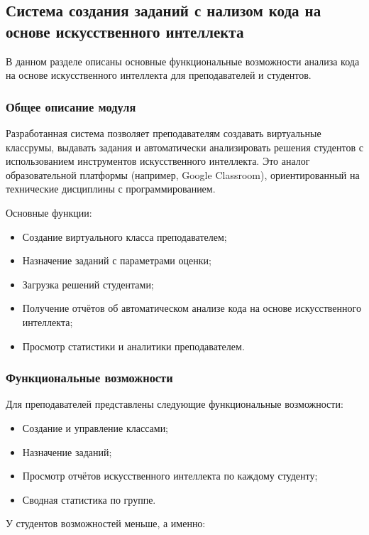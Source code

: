 \subsection{Система создания заданий с нализом кода на основе искусственного интеллекта}

В данном разделе описаны основные функциональные возможности анализа кода на основе искусственного интеллекта для преподавателей и студентов.

\subsubsection{Общее описание модуля}
Разработанная система позволяет преподавателям создавать виртуальные классрумы, выдавать задания и автоматически анализировать решения студентов с использованием инструментов искусственного интеллекта. Это аналог образовательной платформы (например, Google Classroom), ориентированный на технические дисциплины с программированием.

Основные функции:
\begin{itemize}
  \item Создание виртуального класса преподавателем;
  \item Назначение заданий с параметрами оценки;
  \item Загрузка решений студентами;
  \item Получение отчётов об автоматическом анализе кода на основе искусственного интеллекта;
  \item Просмотр статистики и аналитики преподавателем.
\end{itemize}

\subsubsection{Функциональные возможности}

Для преподавателей представлены следующие функциональные возможности: 

\begin{itemize}
  \item Создание и управление классами;
  \item Назначение заданий;
  \item Просмотр отчётов искусственного интеллекта по каждому студенту;
  \item Сводная статистика по группе.
\end{itemize}

У студентов возможностей меньше, а именно:

